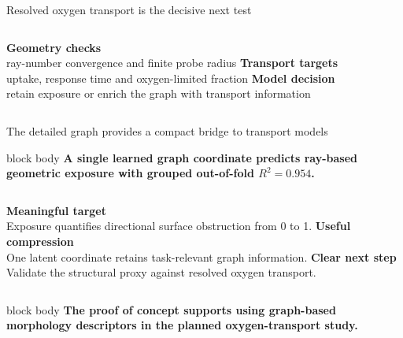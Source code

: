 \documentclass[aspectratio=169,11pt]{beamer}
\newcommand{\hi}[1]{\textcolor{tumblue}{\textbf{#1}}}
\newcommand{\question}[1]{%
  \begin{beamercolorbox}[rounded=true,sep=0.7em]{block body}
    \centering\large\color{tumdark}\textbf{#1}
  \end{beamercolorbox}}
\newcommand{\takeaway}[1]{%
	\begin{beamercolorbox}[rounded=true,sep=.55em]{block body}
		\centering\color{tumdark}\textbf{#1}
\end{beamercolorbox}}
\begin{document}
\begin{frame}{Resolved oxygen transport is the decisive next test}
  \centering
  \vspace{.65cm}
  \begin{columns}[T,onlytextwidth]
    \centering
      \hi{Geometry checks}\\\small ray-number convergence and finite probe radius
    \centering
      \hi{Transport targets}\\\small uptake, response time and oxygen-limited fraction
    \centering
      \hi{Model decision}\\\small retain exposure or enrich the graph with transport information
  \end{columns}
\end{frame}

\begin{frame}{The detailed graph provides a compact bridge to transport models}
  \vspace{.3cm}
  \question{A single learned graph coordinate predicts ray-based geometric exposure with grouped out-of-fold $R^2=0.954$.}
  \vspace{.55cm}
  \begin{columns}[T,onlytextwidth]
    \centering
      \hi{Meaningful target}\\[.25em]
      \small Exposure quantifies directional surface obstruction from 0 to 1.
    \centering
      \hi{Useful compression}\\[.25em]
      \small One latent coordinate retains task-relevant graph information.
    \centering
      \hi{Clear next step}\\[.25em]
      \small Validate the structural proxy against resolved oxygen transport.
  \end{columns}
  \vspace{.65cm}
  \takeaway{The proof of concept supports using graph-based morphology descriptors in the planned oxygen-transport study.}
\end{frame}
\end{document}

